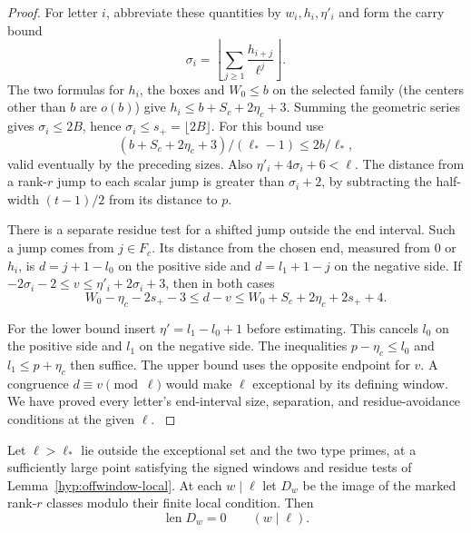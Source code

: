 \begin{proof}
For letter \(i\), abbreviate these quantities by \(w_i,h_i,\eta'_i\)
and form the carry bound
\[
 \sigma_i=\left\lfloor\sum_{j\ge1}\frac{h_{i+j}}{\ell^j}\right\rfloor .
\]
The two formulas for \(h_i\), the boxes and \(W_0\le b\) on the
selected family (the centers other than \(b\) are \(o(b)\))
give \(h_i\le b+S_c+2\eta_c+3\). Summing the
geometric series gives \(\sigma_i\le 2B\), hence
\(\sigma_i\le s_+=\lfloor 2B\rfloor\). For this bound use
\[
 (b+S_c+2\eta_c+3)/(\ell_*-1)\le 2b/\ell_*,
\]
valid
eventually by the preceding sizes. Also
\(\eta'_i+4\sigma_i+6<\ell\). The distance from a rank-\(r\)
jump to each scalar jump is greater than \(\sigma_i+2\), by
subtracting the half-width \((t-1)/2\) from its distance to \(p\).

There is a separate residue test for a shifted jump outside the
end interval. Such a jump comes from \(j\in F_c\). Its distance
from the chosen end, measured from 0 or \(h_i\), is
\(d=j+1-l_0\) on the positive side and \(d=l_1+1-j\) on the
negative side. If \(-2\sigma_i-2\le v\le\eta'_i+2\sigma_i+3\),
then in both cases
\[
 W_0-\eta_c-2s_+-3\le d-v\le
                    W_0+S_c+2\eta_c+2s_++4 .
\]

For the lower bound insert \(\eta'=l_1-l_0+1\) before estimating.
This cancels \(l_0\) on the positive side and \(l_1\) on the
negative side. The inequalities \(p-\eta_c\le l_0\) and
\(l_1\le p+\eta_c\) then suffice. The upper bound uses the
opposite endpoint for \(v\). A congruence \(d\equiv v\pmod\ell\)
would make \(\ell\) exceptional by its defining window.
We have proved every letter's end-interval size, separation, and
residue-avoidance conditions at the given \(\ell\).
\label{cor:large-prime-length-1}
\end{proof}



\begin{proposition}\label{prop:offwindow-local-vanishing}
Let \(\ell>\ell_*\) lie outside the exceptional set and the
two type primes, at a sufficiently large point satisfying the signed windows and residue
tests of Lemma~\ref{hyp:offwindow-local}. At each \(w\mid\ell\) let \(D_w\) be the image of the marked rank-\(r\) classes modulo their finite local condition. Then
\[
 \operatorname{len}D_w=0\qquad(w\mid\ell).
\]
\end{proposition}

